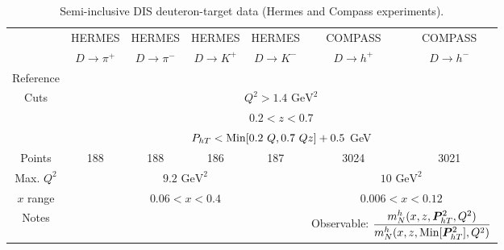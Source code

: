\documentclass[aps,preprintnumbers,showpacs,nofootinbib,superscriptaddress,floatfix]{revtex4}
\newcommand{\Tperp}{T}
\begin{document}
\begin{table}[h!]
\begin{center}
\begin{tabular}{|c|c|c|c|c|c|c|}
 \hline
  & HERMES & HERMES & HERMES & HERMES & COMPASS & COMPASS\\
 ~          &  $D \to \pi^+$    &   $D \to \pi^-$    &  $D \to K^+$    &   $D \to K^-$      &  $D \to h^+$    &   $D \to h^-$            \\
 \hline
 Reference & \multicolumn{4}{c|}{\cite{Airapetian:2012ki}}        &\multicolumn{2}{c|}{\cite{Adolph:2013stb}} \\
\hline
\multirow{3}{*}{Cuts}             & \multicolumn{6}{c|}{$Q^2 > 1.4 \text{ GeV}^2$}     \\
             & \multicolumn{6}{c|}{$0.2 <z <0.7$}     \\
             & \multicolumn{6}{c|}{$P_{h \Tperp}< {\rm Min}[0.2\ Q, 0.7 \ Q z ] +0.5$ GeV}     \\
\hline
 Points         &  188 & 188 & 186 & 187       &      3024    &   3021                 \\
 \hline
Max. $Q^2$      &  \multicolumn{4}{c|}{$9.2 \text{ GeV}^2 $}      & \multicolumn{2}{c|}{$10 \text{ GeV}^2 $}             \\
 \hline
$x$ range       & \multicolumn{4}{c|}{$0.06 < x < 0.4$ }    &  \multicolumn{2}{c|}{$0.006 < x < 0.12$ }             \\
\hline
Notes         &\multicolumn{4}{c|}{ }   & \multicolumn{2}{c|}{Observable: $\displaystyle \frac{m_N^h
    (x,z,\bm{P}_{h\Tperp}^2, Q^2)}{m_N^h (x,z,{\rm Min}[\bm{P}_{h\Tperp}^2], Q^2)}$}             \\
\hline 
\end{tabular}
\caption{Semi-inclusive DIS deuteron-target data (Hermes and Compass experiments).}
\end{center}
\label{t:data_SIDIS_deuteron}
\end{table}
\end{document}
